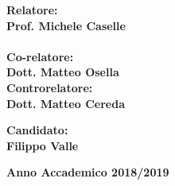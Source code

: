 \begin{titlepage}
\par
\noindent
\begin{minipage}[t]{0.47\textwidth}
{\large{\bf Relatore:\\
Prof. Michele Caselle}}\\
\vspace{4mm}
\\
{\large{\bf Co-relatore:\\
Dott. Matteo Osella }}
\vspace{8mm}
{\large{\bf \\ Controrelatore:\\
Dott. Matteo Cereda}}
\end{minipage}
\hfill
\begin{minipage}[t]{0.47\textwidth}\raggedleft
\vspace{16mm}
{\large{\bf Candidato:\\
Filippo Valle}}
\end{minipage}
\vspace{9mm}
\begin{center}
{\large{\bf 
Anno Accademico 2018/2019}}
\end{center}

\end{titlepage}